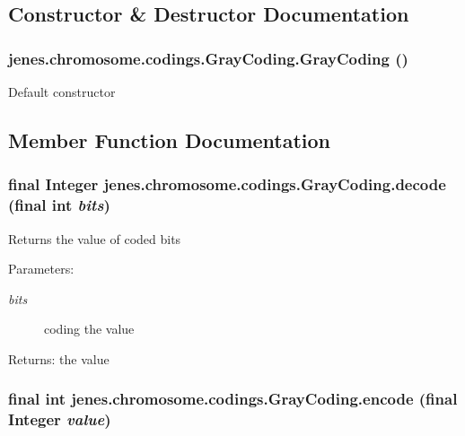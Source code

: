 \subsection{Constructor \& Destructor Documentation}
\hypertarget{classjenes_1_1chromosome_1_1codings_1_1_gray_coding_55dedef21f32baa6e10eec066fc549ba}{
\subsubsection[GrayCoding]{\setlength{\rightskip}{0pt plus 5cm}jenes.chromosome.codings.GrayCoding.GrayCoding ()}}
\label{classjenes_1_1chromosome_1_1codings_1_1_gray_coding_55dedef21f32baa6e10eec066fc549ba}


Default constructor 

\subsection{Member Function Documentation}
\hypertarget{classjenes_1_1chromosome_1_1codings_1_1_gray_coding_b18b4f8ca1b0bed9242254405fde897e}{
\subsubsection[decode]{\setlength{\rightskip}{0pt plus 5cm}final Integer jenes.chromosome.codings.GrayCoding.decode (final int {\em bits})}}
\label{classjenes_1_1chromosome_1_1codings_1_1_gray_coding_b18b4f8ca1b0bed9242254405fde897e}


Returns the value of coded bits

\begin{Desc}
\item[Parameters:]
\begin{description}
\item[{\em bits}]coding the value \end{description}
\end{Desc}
\begin{Desc}
\item[Returns:]the value \end{Desc}
\hypertarget{classjenes_1_1chromosome_1_1codings_1_1_gray_coding_b25d7513076e67bdd6aa15d9797673c0}{
\subsubsection[encode]{\setlength{\rightskip}{0pt plus 5cm}final int jenes.chromosome.codings.GrayCoding.encode (final Integer {\em value})}}
\label{classjenes_1_1chromosome_1_1codings_1_1_gray_coding_b25d7513076e67bdd6aa15d9797673c0}



